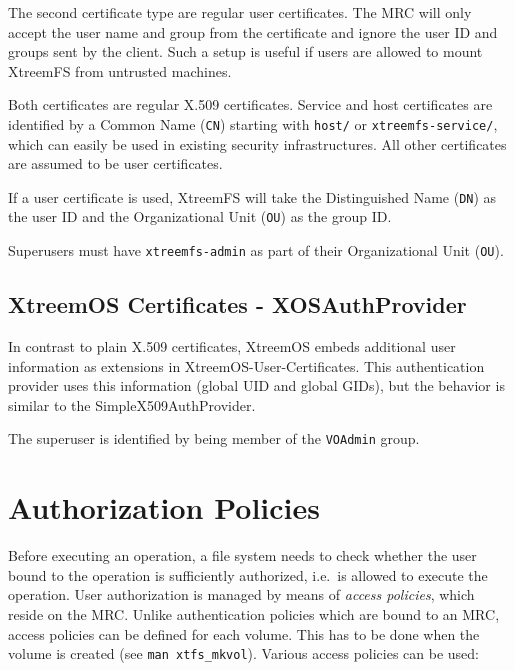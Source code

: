 \documentclass[a4paper,10pt]{book}
\begin{document}
The second certificate type are regular user certificates. The MRC will only accept the user name and group from the certificate and ignore the user ID and groups sent by the client. Such a setup is useful if users are allowed to mount XtreemFS from untrusted machines.

Both certificates are regular X.509 certificates. Service and host certificates are identified by a Common Name (\texttt{CN}) starting with \texttt{host/} or \texttt{xtreemfs-service/}, which can easily be used in existing security infrastructures. All other certificates are assumed to be user certificates.

If a user certificate is used, XtreemFS will take the Distinguished Name (\texttt{DN}) as the user ID and the Organizational Unit (\texttt{OU}) as the group ID.

Superusers must have \texttt{xtreemfs-admin} as part of their Organizational Unit (\texttt{OU}).

\subsection{XtreemOS Certificates - XOSAuthProvider}

In contrast to plain X.509 certificates, XtreemOS embeds additional user information as extensions in XtreemOS-User-Certificates. This authentication provider uses this information (global UID and global GIDs), but the behavior is similar to the SimpleX509AuthProvider.

The superuser is identified by being member of the \texttt{VOAdmin} group.


\section{Authorization Policies} \label{sec:access_policies}
Before executing an operation, a file system needs to check whether the user bound to the operation is sufficiently authorized, i.e.\ is allowed to execute the operation. User authorization is managed by means of \emph{access policies}, which reside on the MRC. Unlike authentication policies which are bound to an MRC, access policies can be defined for each volume. This has to be done when the volume is created (see \texttt{man xtfs\_mkvol}). Various access policies can be used: 
\end{document}
